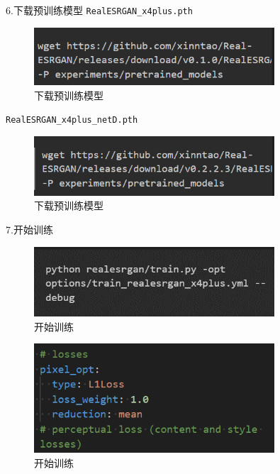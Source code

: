 \documentclass[UTF8,openany]{ctexbook}
\begin{document}
6.下载预训练模型
\texttt{RealESRGAN\_x4plus.pth}

\begin{figure}[H]
  \centering
  \includegraphics[width=0.8\textwidth]{img/9.png}
  \caption{下载预训练模型}
\end{figure}

\texttt{RealESRGAN\_x4plus\_netD.pth}

\begin{figure}[H]
  \centering
  \includegraphics[width=0.8\textwidth]{img/10.png}
  \caption{下载预训练模型}
\end{figure}

7.开始训练

\begin{figure}[H]
  \centering
  \includegraphics[width=0.8\textwidth]{img/11.png}
  \caption{开始训练}
\end{figure}

\begin{figure}[H]
  \centering
  \includegraphics[width=0.8\textwidth]{img/12.png}
  \caption{开始训练}
\end{figure}
\end{document}
